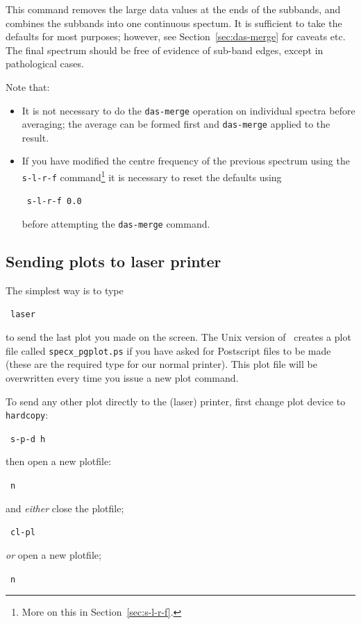 This command removes the large data values at the ends
of the subbands, and combines the subbands into one continuous
spectum.  It is sufficient to take the defaults for most purposes;
however, see Section~\ref{sec:das-merge} for caveats etc.  The final
spectrum should be free of evidence of sub-band edges, except in
pathological cases.


\reversemarginpar
Note that:
\begin{itemize}
\item
It is not necessary to do the {\tt das-merge} operation on individual
spectra before averaging; the average can be formed first and 
{\tt{das-merge}} applied to the result.
\item
If you have modified the centre frequency of the previous spectrum
using the {\tt{s-l-r-f}} command\footnote{More on this in
Section~\ref{sec:s-l-r-f}.} it is necessary to reset the defaults
using

\SP\ {\tt{s-l-r-f 0.0}}

before attempting the {\tt{das-merge}} command. 
\end{itemize}

\subsection{Sending plots to laser printer}
The  simplest way is to type

\SP\ {\tt{laser}}

to send the last plot you made on the screen. The Unix version of
\SPECX\ creates a plot file called \verb|specx_pgplot.ps| if you have
asked for Postscript files to be made (these are the required type for
our normal printer). This plot file will be overwritten every time you
issue a new plot command.

To send any other plot directly to the (laser) printer, first change plot 
device to {\tt{hardcopy}}:

\SP\ {\tt{s-p-d h}}

then open a new plotfile:

\SP\ {\tt{n}}

and {\it{either}} close the plotfile;

\SP\ {\tt{cl-pl}} 

{\it or} open a new plotfile;

\SP\ {\tt{n}}

